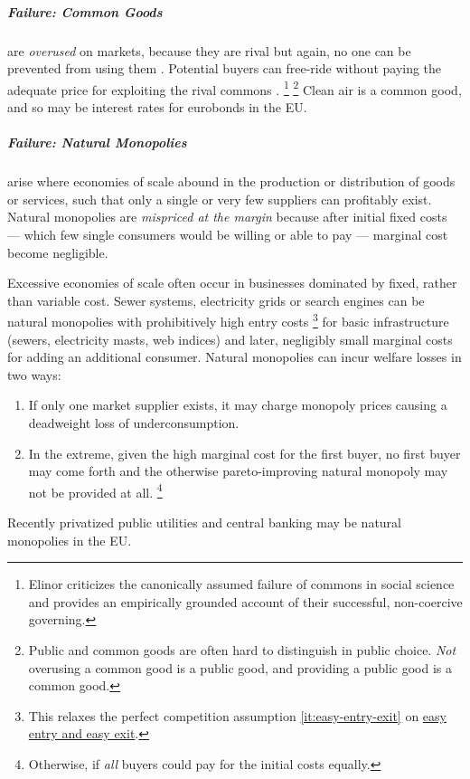 \subparagraph{Failure: Common Goods}  \label{sec:common-good} are \emph{overused} on markets, because they are rival but again, no one can be prevented from using them \citep{Hardin-1968-aa}.
Potential buyers can free-ride without paying the adequate price for exploiting the rival commons \citep{Hardin-1968-aa}.
\footnote{
	Elinor \cite{Ostrom1990} criticizes the canonically assumed failure of commons in social science and provides an empirically grounded account of their successful, non-coercive governing.
}
\footnote{
	Public and common goods are often hard to distinguish in public choice.
	\emph{Not} overusing a common good is a public good, and providing a public good is a common good.
}
Clean air is a common good, and so may be interest rates for eurobonds in the \gls{EU}.

\subparagraph{Failure: Natural Monopolies}  \label{sec:natural-monopoly} arise where economies of scale abound in the production or distribution of goods or services, such that only a single or very few suppliers can profitably exist.
Natural monopolies are \emph{mispriced at the margin} because after initial fixed costs --- which few single consumers would be willing or able to pay --- marginal cost become negligible.

Excessive economies of scale often occur in businesses dominated by fixed, rather than variable cost.
Sewer systems, electricity grids or search engines can be natural monopolies with prohibitively high entry costs
\footnote{
	This relaxes the perfect competition assumption \ref{it:easy-entry-exit} on \hyperref[it:easy-entry-exit]{easy entry and easy exit}.
}
for basic infrastructure (sewers, electricity masts, web indices) and later, negligibly small marginal costs for adding an additional consumer.  Natural monopolies can incur welfare losses in two ways:
\begin{enumerate}
	\item If only one market supplier exists, it may charge monopoly prices causing a deadweight loss of underconsumption.
	\item In the extreme, given the high marginal cost for the first buyer, no first buyer may come forth and the otherwise pareto-improving natural monopoly may not be provided at all.
	\footnote{
		Otherwise, if \emph{all} buyers could pay for the initial costs equally.
	}
\end{enumerate}

Recently privatized public utilities and central banking may be natural monopolies in the \gls{EU}.

